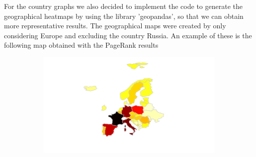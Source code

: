     For the country graphs we also decided to implement the code to generate the geographical heatmaps by using the library
    'geopandas', so that we can obtain more representative results.
    The geographical maps were created by only considering Europe and excluding the country Russia.
    An example of these is the following map obtained with the PageRank results

    \begin{figure}[H]
          \centering
          \begin{subfigure}{0.8\textwidth}
            \centering
            \includegraphics[width=\linewidth]{img/PR_geoMap.png}
            \label{fig:1}
          \end{subfigure}%
          \hfill
          \begin{subfigure}{0.1\textwidth}
            \centering

\end{subfigure}
\end{figure}
